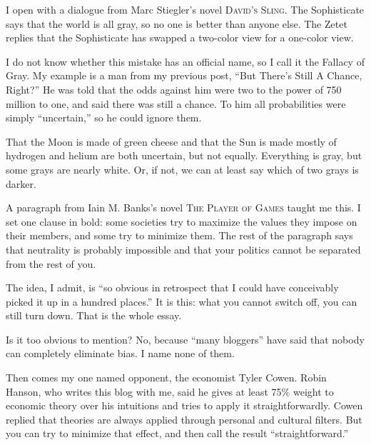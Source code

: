 
I open with a dialogue from Marc Stiegler's novel \textsc{David's Sling}. The Sophisticate says that the world is all gray, so no one is better than anyone else. The Zetet replies that the Sophisticate has swapped a two-color view for a one-color view.

I do not know whether this mistake has an official name, so I call it the Fallacy of Gray.  My example is a man from my previous post, ``But There's Still A Chance, Right?'' He was told that the odds against him were two to the power of 750 million to one, and said there was still a chance. To him all probabilities were simply ``uncertain,'' so he could ignore them.

That the Moon is made of green cheese and that the Sun is made mostly of hydrogen and helium are both uncertain, but not equally. Everything is gray, but some grays are nearly white. Or, if not, we can at least say which of two grays is darker.

A paragraph from Iain M. Banks's novel \textsc{The Player of Games} taught me this. I set one clause in bold: some societies try to maximize the values they impose on their members, and some try to minimize them. The rest of the paragraph says that neutrality is probably impossible and that your politics cannot be separated from the rest of you.

The idea, I admit, is ``so obvious in retrospect that I could have conceivably picked it up in a hundred places.'' It is this: what you cannot switch off, you can still turn down. That is the whole essay.

Is it too obvious to mention? No, because ``many bloggers'' have said that nobody can completely eliminate bias. I name none of them.

Then comes my one named opponent, the economist Tyler Cowen. Robin Hanson, who writes this blog with me, said he gives at least 75\% weight to economic theory over his intuitions and tries to apply it straightforwardly. Cowen replied that theories are always applied through personal and cultural filters. But you can try to minimize that effect, and then call the result ``straightforward.'' 

